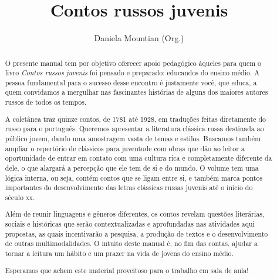 \documentclass[11pt]{extarticle}
\begin{document}
\newcommand{\AutorLivro}{Daniela Mountian (Org.)}
\newcommand{\TituloLivro}{Contos russos juvenis}
\newcommand{\Tema}{Ficção, mistério e fantasia}
\newcommand{\Genero}{Conto, crônica e novela}
\newcommand{\imagemCapa}{./images/PNLD0050-01.png}
\newcommand{\issnppub}{---}
\newcommand{\issnepub}{---}
\newcommand{\colaborador}{\textbf{Marina Darmaros} Marina Darmaros é jornalista e tradutora. Formada pela Cásper Líbero em Comunicação Social, tem mestrado em Jornalismo Internacional pela Universidade Russa da Amizade dos Povos (RUDN/Patrice Lumumba) e doutorado em Literatura e Cultura Russa pela Universidade de São Paulo.}


\title{\TituloLivro}
\author{\AutorLivro}
\def\authornotes{\colaborador}

\date{}
\maketitle






\begin{abstract}
O presente manual tem por objetivo oferecer apoio pedagógico àqueles
para quem o livro \emph{Contos russos} \emph{juvenis} foi pensado e
preparado: educandos do ensino médio. A pessoa fundamental para o
sucesso desse encontro é justamente você, que educa, a quem convidamos a
mergulhar nas fascinantes histórias de alguns dos maiores autores russos
de todos os tempos.

A coletânea traz quinze contos, de 1781 até 1928, em traduções feitas
diretamente do russo para o português. Queremos apresentar a literatura
clássica russa destinada ao público jovem, dando uma amostragem vasta de
temas e estilos. Buscamos também ampliar o repertório de clássicos para 
juventude com obras que dão ao leitor a oportunidade de entrar em contato com uma
cultura rica e completamente diferente da dele, o que alargará a
percepção que ele tem de si e do mundo. O volume tem uma lógica interna,
ou seja, contém contos que se ligam entre si, e também marca pontos
importantes do desenvolvimento das letras clássicas russas juvenis até o
início do século \textsc{xx}.

Além de reunir linguagens e gêneros diferentes, os contos revelam
questões literárias, sociais e históricas que serão contextualizadas e
aprofundadas nas atividades aqui propostas, as quais incentivarão a
pesquisa, a produção de textos e o desenvolvimento de outras
multimodalidades. O intuito deste manual é, no fim das contas, ajudar a
tornar a leitura um hábito e um prazer na vida de jovens do ensino médio.

Esperamos que achem este material proveitoso para o trabalho em sala de
aula!

\end{abstract}
\tableofcontents
\end{document}
